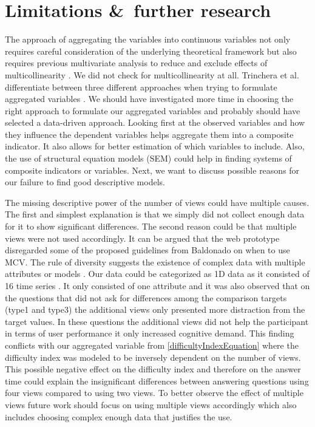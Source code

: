 \section{Limitations \&\ further research}
The approach of aggregating the variables into continuous variables not only requires careful consideration of the underlying theoretical framework
but also requires previous multivariate analysis to reduce and exclude effects of multicollinearity \citep*{MichelaNardo.2005}. We did not check for multicollinearity
at all.
Trinchera et al. differentiate between three different approaches when trying to formulate aggregated variables \citep*{Trinchera.2008}. We should have
investigated more time in choosing the right approach to formulate our aggregated variables and probably should have selected a data-driven approach. Looking first at 
the observed variables and how they influence the dependent variables helps aggregate them into a composite indicator. It also allows for better estimation of which
variables to include. Also, the use of structural equation models (SEM) could help in finding systems of composite indicators or variables. Next, we want to discuss possible 
reasons for our failure to find good descriptive models.

The missing descriptive power of the number of views could have multiple causes. The first and simplest explanation is that we simply did not collect enough data for it
to show significant differences. The second reason could be that multiple views were not used accordingly. 
It can be argued that the web prototype disregarded some of the proposed guidelines from Baldonado on when to use MCV. The rule of diversity
suggests the existence of complex data with multiple attributes or models \citep*{WangBaldonado.2000}. Our data could be categorized as 1D data as it consisted of 16
time series \citep*{Keim.2005}. It only consisted of one attribute and it was also observed that on the questions that did not ask for differences among
the comparison targets (type1 and type3) the additional views only presented more distraction from the target values. In these questions the additional views did not
help the participant in terms of user performance it only increased cognitive demand. This finding conflicts with our aggregated variable from \ref{difficultyIndexEquation}
where the difficulty index was modeled to be inversely dependent on the number of views. This possible negative effect on the difficulty index and therefore on the
answer time could explain the insignificant differences between answering questions using four views compared to using two views. To better observe the effect of
multiple views future work should focus on using multiple views accordingly which also includes choosing complex enough data that justifies the use.

